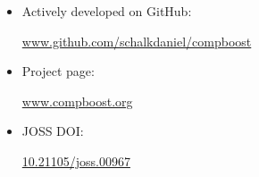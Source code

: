 \documentclass[10pt]{beamer}\usepackage[]{graphicx}\usepackage[]{color}
\begin{document}
\begin{frame}[plain]

\begin{itemize}

  \item
    Actively developed on GitHub:
    \vspace{0.3cm}
    \begin{center}
      \url{www.github.com/schalkdaniel/compboost}
    \end{center}
    \vspace{0.5cm}

  \item
    Project page:
    \vspace{0.3cm}
    \begin{center}
      \url{www.compboost.org}
    \end{center}
    \vspace{0.5cm}

  \item
    JOSS DOI:
    \vspace{0.3cm}
    \begin{center}
      \href{https://joss.theoj.org/papers/94cfdbbfdfc8796c5bdb1a74ee59fcda}{\textcolor{metropolis_orange}{10.21105/joss.00967}}
    \end{center}

\end{itemize}

\end{frame}
\end{document}
